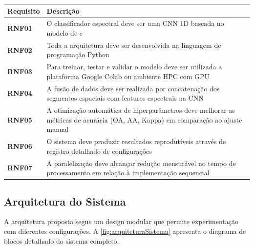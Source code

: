 \begin{quadro}[H]
    \centering
    \caption{Requisitos não funcionais}
    \begin{tabular}{|p{}|p{}|}
       \hline
        \rowcolor[HTML]{C0C0C0}
        \textbf{Requisito} & \textbf{Descrição}  \\
        \hline
        
        \textbf{RNF01} & O classificador espectral deve ser uma CNN 1D baseada no modelo de \cite{Souza2023} e \cite{Viel10064297} \\
        \hline
        
        \textbf{RNF02} & Toda a arquitetura deve ser desenvolvida na linguagem de programação Python \\
        \hline

        \textbf{RNF03} & Para treinar, testar e validar o modelo deve ser utilizada a plataforma Google Colab ou ambiente HPC com GPU \\
        \hline

        \textbf{RNF04} & A fusão de dados deve ser realizada por concatenação dos segmentos espaciais com features espectrais na CNN \\
        \hline

        \textbf{RNF05} & A otimização automática de hiperparâmetros deve melhorar as métricas de acurácia (OA, AA, Kappa) em comparação ao ajuste manual \\
        \hline

        \textbf{RNF06} & O sistema deve produzir resultados reprodutíveis através de registro detalhado de configurações \\
        \hline
        
        \textbf{RNF07} & A paralelização deve alcançar redução mensurável no tempo de processamento em relação à implementação sequencial \\
        \hline
    \end{tabular}
    \label{tab:rnf}
\end{quadro}

\subsection{Arquitetura do Sistema} 
\label{subsec:arquitetura}

A arquitetura proposta segue um design modular que permite experimentação com diferentes configurações. A \autoref{fig:arquiteturaSistema} apresenta o diagrama de blocos detalhado do sistema completo.

